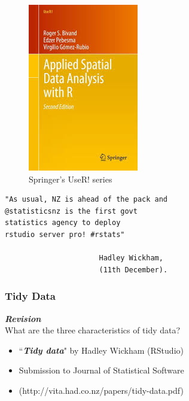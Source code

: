 \documentclass{beamer}
\begin{document}
\begin{frame}
	
	
	
	
	\begin{figure}
\centering
\includegraphics[width=0.45\linewidth]{"ASDAbook cover"}
\caption{Springer's UseR! series}
\end{figure}

\end{frame}
\begin{frame}[fragile]
\Large
\begin{framed}
\begin{verbatim}
"As usual, NZ is ahead of the pack and 
@statisticsnz is the first govt 
statistics agency to deploy 
rstudio server pro! #rstats"

                      Hadley Wickham, 
                      (11th December).
\end{verbatim}
\end{framed}

\end{frame}
\begin{frame}	
	
\frametitle{Tidy Data}
\textbf{\textit{Revision}}\\
What are the three characteristics of tidy data?

\begin{itemize}
	\item ``\textit{\textbf{Tidy data}}" by Hadley Wickham (RStudio)
	\item Submission to Journal of Statistical Software
	\item (http://vita.had.co.nz/papers/tidy-data.pdf)
\end{itemize}

\end{frame}
\end{document}
